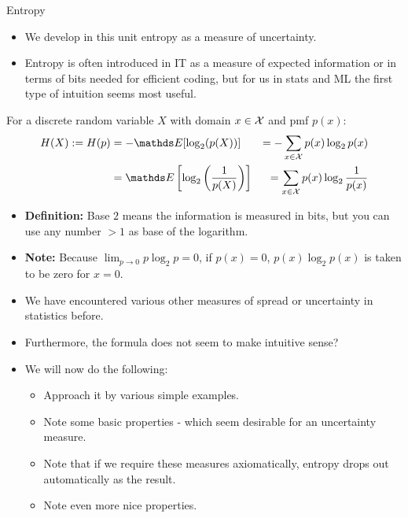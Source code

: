 \begin{vbframe}{Entropy}
\begin{itemize}
  \item We develop in this unit entropy as a measure of uncertainty.
  \item Entropy is often introduced in IT as a measure of
    expected information or in terms of bits needed for efficient coding, 
  but for us in stats and ML the first type of intuition seems most useful.
\end{itemize}


For a discrete random variable $X$ with domain $x \in \mathcal{X}$ and pmf $p(x)$:
\begin{equation*}
\begin{aligned} 
  H(X) := H(p) &= - \E[\log_2(p(X))]           &= -\sum_{x \in \Xspace} p(x) \log_2 p(x)\\ 
               &=   \E\left[\log_2\left(\frac{1}{p(X)}\right)\right] &= \sum_{x \in \Xspace} p(x) \log_2 \frac{1}{p(x)} 
\end{aligned} 
\end{equation*}
    \begin{itemize}
  \item \textbf{Definition:}
Base $2$ means the information is measured in bits, but you can use any number $>1$ as base of the logarithm.
    \item \textbf{Note:} Because $\lim _{p \rightarrow 0} p \log_2 p=0$, if $p(x) = 0$, $p(x) \log_2 p(x)$ is taken to be zero for $x=0$.
  \end{itemize}

\framebreak

\begin{itemize}
    \item We have encountered various other measures of spread or uncertainty in statistics before.
    \item Furthermore, the formula does not seem to make intuitive sense?
    \item We will now do the following:
    \begin{itemize}
      \item Approach it by various simple examples.
      \item Note some basic properties - which seem desirable for an uncertainty measure.
      \item Note that if we require these measures axiomatically, entropy drops out automatically as the result.
      \item Note even more nice properties.
  \end{itemize}
\end{itemize}
\end{vbframe}


